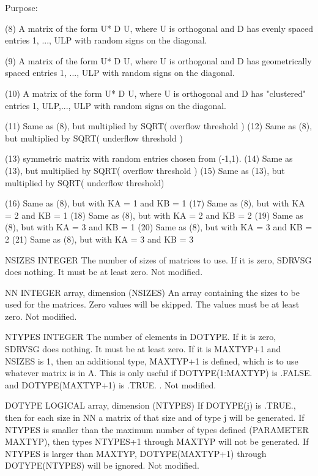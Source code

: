 \begin{DoxyParagraph}{Purpose\+: }
\begin{DoxyVerb}
      (8)  A matrix of the form  U* D U, where U is orthogonal and
           D has evenly spaced entries 1, ..., ULP with random signs
           on the diagonal.

      (9)  A matrix of the form  U* D U, where U is orthogonal and
           D has geometrically spaced entries 1, ..., ULP with random
           signs on the diagonal.

      (10) A matrix of the form  U* D U, where U is orthogonal and
           D has "clustered" entries 1, ULP,..., ULP with random
           signs on the diagonal.

      (11) Same as (8), but multiplied by SQRT( overflow threshold )
      (12) Same as (8), but multiplied by SQRT( underflow threshold )

      (13) symmetric matrix with random entries chosen from (-1,1).
      (14) Same as (13), but multiplied by SQRT( overflow threshold )
      (15) Same as (13), but multiplied by SQRT( underflow threshold)

      (16) Same as (8), but with KA = 1 and KB = 1
      (17) Same as (8), but with KA = 2 and KB = 1
      (18) Same as (8), but with KA = 2 and KB = 2
      (19) Same as (8), but with KA = 3 and KB = 1
      (20) Same as (8), but with KA = 3 and KB = 2
      (21) Same as (8), but with KA = 3 and KB = 3\end{DoxyVerb}
 \begin{DoxyVerb}  NSIZES  INTEGER
          The number of sizes of matrices to use.  If it is zero,
          SDRVSG does nothing.  It must be at least zero.
          Not modified.

  NN      INTEGER array, dimension (NSIZES)
          An array containing the sizes to be used for the matrices.
          Zero values will be skipped.  The values must be at least
          zero.
          Not modified.

  NTYPES  INTEGER
          The number of elements in DOTYPE.   If it is zero, SDRVSG
          does nothing.  It must be at least zero.  If it is MAXTYP+1
          and NSIZES is 1, then an additional type, MAXTYP+1 is
          defined, which is to use whatever matrix is in A.  This
          is only useful if DOTYPE(1:MAXTYP) is .FALSE. and
          DOTYPE(MAXTYP+1) is .TRUE. .
          Not modified.

  DOTYPE  LOGICAL array, dimension (NTYPES)
          If DOTYPE(j) is .TRUE., then for each size in NN a
          matrix of that size and of type j will be generated.
          If NTYPES is smaller than the maximum number of types
          defined (PARAMETER MAXTYP), then types NTYPES+1 through
          MAXTYP will not be generated.  If NTYPES is larger
          than MAXTYP, DOTYPE(MAXTYP+1) through DOTYPE(NTYPES)
          will be ignored.
          Not modified.


\end{DoxyVerb}
\end{DoxyParagraph}
